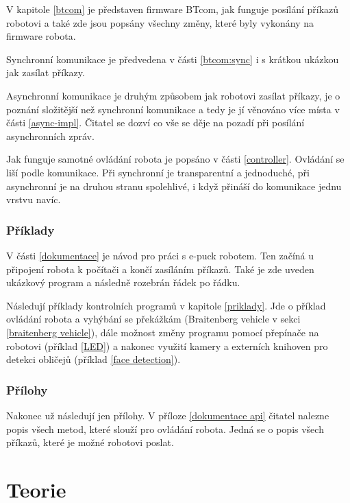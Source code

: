 \documentclass[12pt,notitlepage]{report}
\begin{document}
    V kapitole \ref{btcom} je představen firmware BTcom, jak funguje posílání
    příkazů robotovi a také zde jsou popsány všechny změny, které byly vykonány
    na firmware robota.

    Synchronní komunikace je předvedena v části \ref{btcom:sync} i s krátkou
    ukázkou jak zasílat příkazy.

    Asynchronní komunikace je druhým způsobem jak robotovi zasílat příkazy, je
    o poznání složitější než synchronní komunikace a tedy je jí věnováno více
    místa v části \ref{async-impl}. Čitatel se dozví co vše se děje na pozadí
    při posílání asynchronních zpráv.

    Jak funguje samotné ovládání robota je popsáno v části \ref{controller}.
    Ovládání se liší podle komunikace. Při synchronní je transparentní a
    jednoduché, při asynchronní je na druhou stranu spolehlivé, i když přináší
    do komunikace jednu vrstvu navíc.

    \subsection{Příklady}

    V části \ref{dokumentace} je návod pro práci s e-puck robotem. Ten začíná u
    připojení robota k počítači a končí zasíláním příkazů. Také je zde uveden
    ukázkový program a následně rozebrán řádek po řádku.

    Následují příklady kontrolních programů v kapitole \ref{priklady}. Jde o
    příklad ovládání robota a vyhýbání se překážkám (Braitenberg vehicle v
    sekci \ref{braitenberg vehicle}), dále možnost změny programu pomocí
    přepínače na robotovi (příklad \ref{LED}) a nakonec využití kamery a
    externích knihoven pro detekci obličejů (příklad \ref{face detection}).

    \subsection{Přílohy}

    Nakonec už následují jen přílohy. V příloze \ref{dokumentace api} čitatel
    nalezne popis všech metod, které slouží pro ovládání robota. Jedná se o
    popis všech příkazů, které je možné robotovi poslat.

\chapter{Teorie} %
\end{document}
